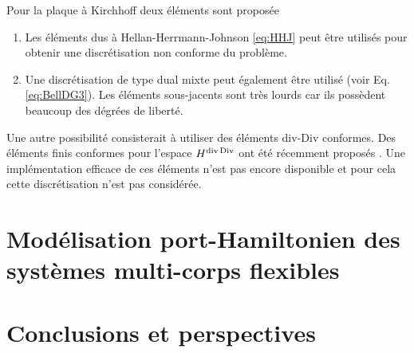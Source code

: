 Pour la plaque à Kirchhoff deux éléments sont proposée
\begin{enumerate}
	\item Les éléments dus à Hellan-Herrmann-Johnson \eqref{eq:HHJ} \cite{hellan1967,herrmann1967finite,johnson1973convergence} peut être utilisés pour obtenir une discrétisation non conforme du problème.
	\item Une discrétisation de type dual mixte peut également être utilisé (voir Eq. \eqref{eq:BellDG3}). Les éléments sous-jacents sont très lourds car ils possèdent beaucoup des dégrées de liberté.
\end{enumerate}

Une autre possibilité consisterait à utiliser des éléments div-Div conformes. Des éléments finis conformes pour l'espace $ H^{\operatorname{div}\operatorname*{Div}} $ ont été récemment proposés \cite{chen2020divDiv}. Une implémentation efficace de ces éléments n'est pas encore disponible et pour cela cette discrétisation n'est pas considérée.


\section{Modélisation port-Hamiltonien des systèmes multi-corps flexibles}



\newpage
\section{Conclusions et perspectives}

